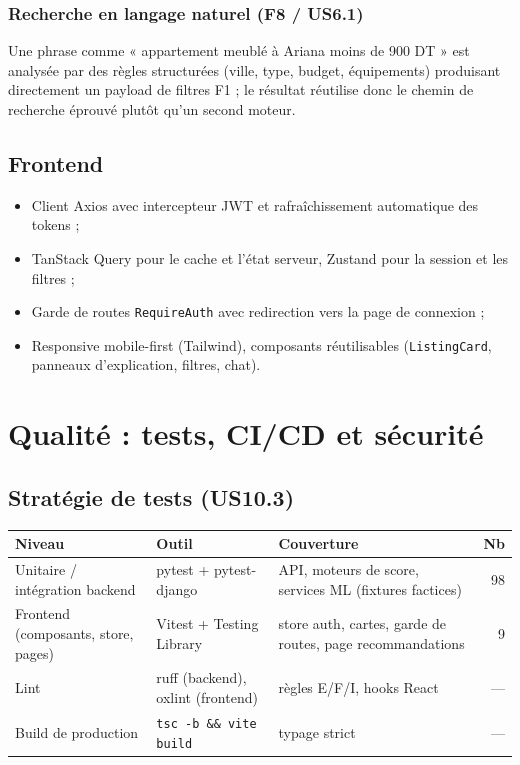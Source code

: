 \documentclass[11pt,a4paper]{report}
\begin{document}
\subsection{Recherche en langage naturel (F8 / US6.1)}
Une phrase comme « appartement meublé à Ariana moins de 900 DT » est analysée par des règles
structurées (ville, type, budget, équipements) produisant directement un payload de filtres F1 ;
le résultat réutilise donc le chemin de recherche éprouvé plutôt qu'un second moteur.

\section{Frontend}
\begin{itemize}[leftmargin=*]
  \item Client Axios avec intercepteur JWT et rafraîchissement automatique des tokens ;
  \item TanStack Query pour le cache et l'état serveur, Zustand pour la session et les filtres ;
  \item Garde de routes \texttt{RequireAuth} avec redirection vers la page de connexion ;
  \item Responsive mobile-first (Tailwind), composants réutilisables (\texttt{ListingCard},
        panneaux d'explication, filtres, chat).
\end{itemize}

\chapter{Qualité : tests, CI/CD et sécurité}

\section{Stratégie de tests (US10.3)}
\begin{center}
\begin{tabularx}{\textwidth}{lXXr}
\toprule
\textbf{Niveau} & \textbf{Outil} & \textbf{Couverture} & \textbf{Nb} \\
\midrule
Unitaire / intégration backend & pytest + pytest-django & API, moteurs de score, services ML
(fixtures factices) & 98 \\
Frontend (composants, store, pages) & Vitest + Testing Library & store auth, cartes, garde de
routes, page recommandations & 9 \\
Lint & ruff (backend), oxlint (frontend) & règles E/F/I, hooks React & --- \\
Build de production & \texttt{tsc -b \&\& vite build} & typage strict & --- \\
\bottomrule
\end{tabularx}
\end{center}
\end{document}
